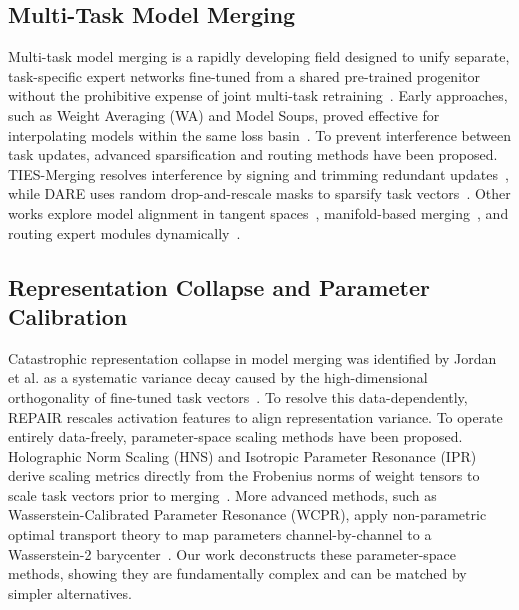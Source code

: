 \documentclass{article}
\begin{document}
\subsection{Multi-Task Model Merging}
Multi-task model merging is a rapidly developing field designed to unify separate, task-specific expert networks fine-tuned from a shared pre-trained progenitor without the prohibitive expense of joint multi-task retraining~\cite{wortsman2022model,ilharco2023editing,matena2022merging}. Early approaches, such as Weight Averaging (WA) and Model Soups, proved effective for interpolating models within the same loss basin~\cite{wortsman2022model,izmailov2018averaging,ainsworth2022git}. To prevent interference between task updates, advanced sparsification and routing methods have been proposed. TIES-Merging resolves interference by signing and trimming redundant updates~\cite{yadav2023ties}, while DARE uses random drop-and-rescale masks to sparsify task vectors~\cite{yu2024dare}. Other works explore model alignment in tangent spaces~\cite{ortiz2023task}, manifold-based merging~\cite{wang2026manifold}, and routing expert modules dynamically~\cite{daheim2024model,zhang2024merging}.

\subsection{Representation Collapse and Parameter Calibration}
Catastrophic representation collapse in model merging was identified by Jordan et al. as a systematic variance decay caused by the high-dimensional orthogonality of fine-tuned task vectors~\cite{jordan2023repair}. To resolve this data-dependently, REPAIR rescales activation features to align representation variance. To operate entirely data-freely, parameter-space scaling methods have been proposed. Holographic Norm Scaling (HNS) and Isotropic Parameter Resonance (IPR) derive scaling metrics directly from the Frobenius norms of weight tensors to scale task vectors prior to merging~\cite{submission5}. More advanced methods, such as Wasserstein-Calibrated Parameter Resonance (WCPR), apply non-parametric optimal transport theory to map parameters channel-by-channel to a Wasserstein-2 barycenter~\cite{submission9}. Our work deconstructs these parameter-space methods, showing they are fundamentally complex and can be matched by simpler alternatives.
\end{document}
